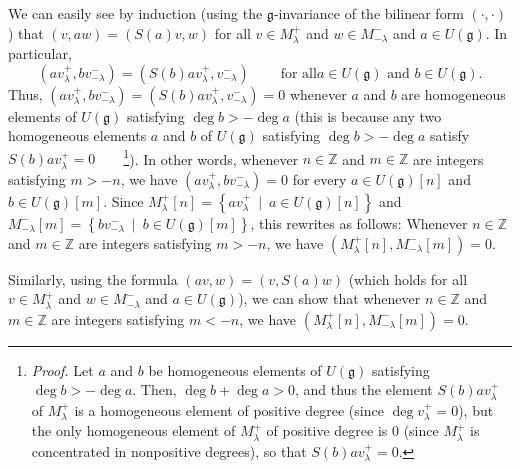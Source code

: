 \documentclass
[numbers=enddot,12pt,final,onecolumn,german,notitlepage]{scrartcl}%
\theoremstyle{definition}
\begin{document}
We can easily see by induction (using the $\mathfrak{g}$-invariance of the
bilinear form $\left(  \cdot,\cdot\right)  $) that $\left(  v,aw\right)
=\left(  S\left(  a\right)  v,w\right)  $ for all $v\in M_{\lambda}^{+}$ and
$w\in M_{-\lambda}^{-}$ and $a\in U\left(  \mathfrak{g}\right)  $. In
particular,%
\[
\left(  av_{\lambda}^{+},bv_{-\lambda}^{-}\right)  =\left(  S\left(  b\right)
av_{\lambda}^{+},v_{-\lambda}^{-}\right)  \ \ \ \ \ \ \ \ \ \ \text{for all
}a\in U\left(  \mathfrak{g}\right)  \text{ and }b\in U\left(  \mathfrak{g}%
\right)  .
\]
Thus, $\left(  av_{\lambda}^{+},bv_{-\lambda}^{-}\right)  =\left(  S\left(
b\right)  av_{\lambda}^{+},v_{-\lambda}^{-}\right)  =0$ whenever $a$ and $b$
are homogeneous elements of $U\left(  \mathfrak{g}\right)  $ satisfying $\deg
b>-\deg a$ (this is because any two homogeneous elements $a$ and $b$ of
$U\left(  \mathfrak{g}\right)  $ satisfying $\deg b>-\deg a$ satisfy $S\left(
b\right)  av_{\lambda}^{+}=0$\ \ \ \ \footnote{\textit{Proof.} Let $a$ and $b$
be homogeneous elements of $U\left(  \mathfrak{g}\right)  $ satisfying $\deg
b>-\deg a$. Then, $\deg b+\deg a>0$, and thus the element $S\left(  b\right)
av_{\lambda}^{+}$ of $M_{\lambda}^{+}$ is a homogeneous element of positive
degree (since $\deg v_{\lambda}^{+}=0$), but the only homogeneous element of
$M_{\lambda}^{+}$ of positive degree is $0$ (since $M_{\lambda}^{+}$ is
concentrated in nonpositive degrees), so that $S\left(  b\right)  av_{\lambda
}^{+}=0$.}). In other words, whenever $n\in\mathbb{Z}$ and $m\in\mathbb{Z}$
are integers satisfying $m>-n$, we have $\left(  av_{\lambda}^{+}%
,bv_{-\lambda}^{-}\right)  =0$ for every $a\in U\left(  \mathfrak{g}\right)
\left[  n\right]  $ and $b\in U\left(  \mathfrak{g}\right)  \left[  m\right]
$. Since $M_{\lambda}^{+}\left[  n\right]  =\left\{  av_{\lambda}^{+}%
\ \mid\ a\in U\left(  \mathfrak{g}\right)  \left[  n\right]  \right\}  $ and
$M_{-\lambda}^{-}\left[  m\right]  =\left\{  bv_{-\lambda}^{-}\ \mid\ b\in
U\left(  \mathfrak{g}\right)  \left[  m\right]  \right\}  $, this rewrites as
follows: Whenever $n\in\mathbb{Z}$ and $m\in\mathbb{Z}$ are integers
satisfying $m>-n$, we have $\left(  M_{\lambda}^{+}\left[  n\right]
,M_{-\lambda}^{-}\left[  m\right]  \right)  =0$.

Similarly, using the formula $\left(  av,w\right)  =\left(  v,S\left(
a\right)  w\right)  $ (which holds for all $v\in M_{\lambda}^{+}$ and $w\in
M_{-\lambda}^{-}$ and $a\in U\left(  \mathfrak{g}\right)  $), we can show that
whenever $n\in\mathbb{Z}$ and $m\in\mathbb{Z}$ are integers satisfying $m<-n$,
we have $\left(  M_{\lambda}^{+}\left[  n\right]  ,M_{-\lambda}^{-}\left[
m\right]  \right)  =0$.
\end{document}
